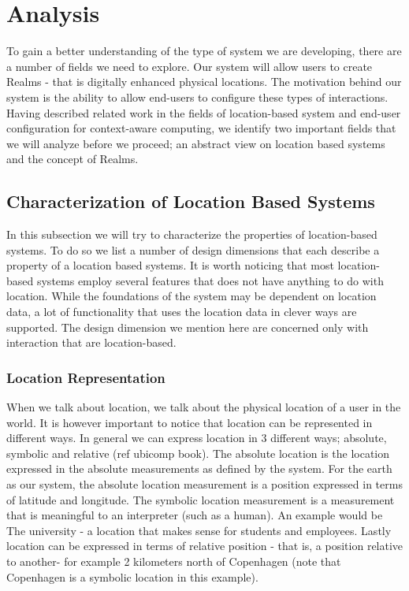 \section{Analysis} %
\label{sec:analysis}
To gain a better understanding of the type of system we are developing, there are a number of fields we need to explore. Our system will allow users to create Realms - that is digitally enhanced physical locations. The motivation behind our system is the ability to allow end-users to configure these types of interactions. Having described related work in the fields of location-based system and end-user configuration for context-aware computing, we identify two important fields that we will analyze before we proceed; an abstract view on location based systems and the concept of Realms.

\subsection{Characterization of Location Based Systems} %
\label{sub:taxanomy_of_location_features}
In this subsection we will try to characterize the properties of location-based systems. To do so we list a number of design dimensions that each describe a property of a location based systems. It is worth noticing that most location-based systems employ several features that does not have anything to do with location. While the foundations of the system may be dependent on location data, a lot of functionality that uses the location data in clever ways are supported. The design dimension we mention here are concerned only with interaction that are location-based. 

\subsubsection{Location Representation}
When we talk about location, we talk about the physical location of a user in the world. It is however important to notice that location can be represented in different ways. In general we can express location in 3 different ways; absolute, symbolic and relative (ref ubicomp book). The absolute location is the location expressed in the absolute measurements as defined by the system. For the earth as our system, the absolute location measurement is a position expressed in terms of latitude and longitude. The symbolic location measurement is a measurement that is meaningful to an interpreter (such as a human). An example would be The university - a location that makes sense for students and employees. Lastly location can be expressed in terms of relative position - that is, a position relative to another- for example 2 kilometers north of Copenhagen (note that Copenhagen is a symbolic location in this example).

